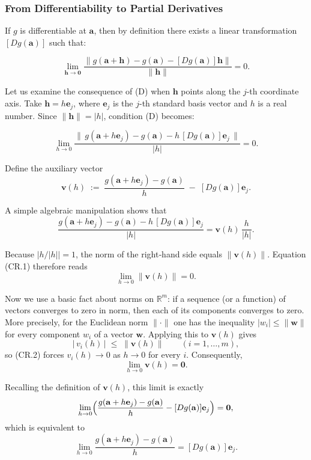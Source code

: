 \begin{notechapter}
\subsubsection{From Differentiability to Partial Derivatives}

If $g$ is differentiable at $\mathbf{a}$, then by definition there exists a
linear transformation $[Dg(\mathbf{a})]$ such that:

\[
\lim_{\mathbf{h} \to \mathbf{0}} \frac{\|g(\mathbf{a} + \mathbf{h}) - g(\mathbf{a}) - [Dg(\mathbf{a})]\mathbf{h}\|}{\|\mathbf{h}\|} = 0.
\tag{D}
\]

Let us examine the consequence of (D) when $\mathbf{h}$ points along the $j$-th
coordinate axis. Take $\mathbf{h} = h\mathbf{e}_j$, where $\mathbf{e}_j$ is the
$j$-th standard basis vector and $h$ is a real number. Since $\|\mathbf{h}\| =
|h|$, condition (D) becomes:

\[
\lim_{h \to 0} \frac{\|\,g(\mathbf{a} + h\mathbf{e}_j) - g(\mathbf{a}) - h\,[Dg(\mathbf{a})]\mathbf{e}_j\,\|}{|h|} = 0.
\tag{CR.1}
\]

Define the auxiliary vector
\[
\mathbf{v}(h) \;:=\; \frac{g(\mathbf{a} + h\mathbf{e}_j) - g(\mathbf{a})}{h} \;-\; [Dg(\mathbf{a})]\mathbf{e}_j .
\]

A simple algebraic manipulation shows that
\[
\frac{g(\mathbf{a} + h\mathbf{e}_j) - g(\mathbf{a}) - h\,[Dg(\mathbf{a})]\mathbf{e}_j}{|h|}
= \mathbf{v}(h)\,\frac{h}{|h|}.
\]

Because $|h/|h|| = 1$, the norm of the right‑hand side equals
$\|\mathbf{v}(h)\|$. Equation (CR.1) therefore reads
\[
\lim_{h \to 0} \|\mathbf{v}(h)\| = 0.
\tag{CR.2}
\]

Now we use a basic fact about norms on $\mathbb{R}^m$: if a sequence (or a
function) of vectors converges to zero in norm, then each of its components
converges to zero. More precisely, for the Euclidean norm $\|\cdot\|$ one has
the inequality $|w_i| \le \|\mathbf{w}\|$ for every component $w_i$ of a vector
$\mathbf{w}$. Applying this to $\mathbf{v}(h)$ gives
\[
|\,v_i(h)\,| \;\le\; \|\mathbf{v}(h)\| \qquad (i=1,\dots,m),
\]
so (CR.2) forces $v_i(h) \to 0$ as $h\to 0$ for every $i$. Consequently,
\[
\lim_{h \to 0} \mathbf{v}(h) = \mathbf{0}.
\]

Recalling the definition of $\mathbf{v}(h)$, this limit is exactly
\[
\lim_{h \to 0} \Bigl(\frac{g(\mathbf{a} + h\mathbf{e}_j) - g(\mathbf{a})}{h} - [Dg(\mathbf{a})]\mathbf{e}_j\Bigr) = \mathbf{0},
\]
which is equivalent to
\[
\lim_{h \to 0} \frac{g(\mathbf{a} + h\mathbf{e}_j) - g(\mathbf{a})}{h} = [Dg(\mathbf{a})]\mathbf{e}_j .
\tag{CR.3}
\]


\end{notechapter}
